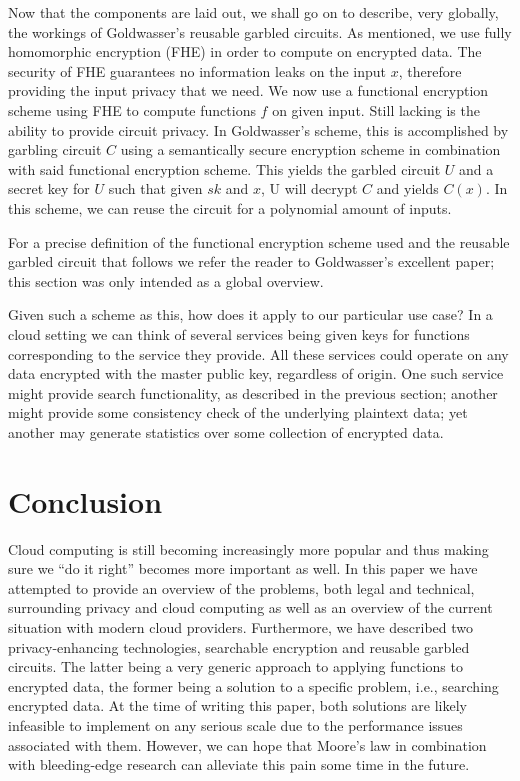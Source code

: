 \documentclass[12pt]{article}
\begin{document}
Now that the components are laid out, we shall go on to describe, very globally, the workings of Goldwasser's reusable garbled circuits.
As mentioned, we use fully homomorphic encryption (FHE) in order to compute on encrypted data.
The security of FHE guarantees no information leaks on the input $x$, therefore providing the input privacy that we need.
We now use a functional encryption scheme using FHE to compute functions $f$ on given input.
Still lacking is the ability to provide circuit privacy.
In Goldwasser's scheme, this is accomplished by garbling circuit $C$ using a semantically secure encryption scheme in combination with said functional encryption scheme.
This yields the garbled circuit $U$ and a secret key for $U$ such that given $sk$ and $x$, U will decrypt $C$ and yields $C(x)$.
In this scheme, we can reuse the circuit for a polynomial amount of inputs.

For a precise definition of the functional encryption scheme used and the reusable garbled circuit that follows we refer the reader to Goldwasser's excellent paper; this section was only intended as a global overview.

Given such a scheme as this, how does it apply to our particular use case?
In a cloud setting we can think of several services being given keys for functions corresponding to the service they provide.
All these services could operate on any data encrypted with the master public key, regardless of origin.
One such service might provide search functionality, as described in the previous section;
another might provide some consistency check of the underlying plaintext data;
yet another may generate statistics over some collection of encrypted data.

\section{Conclusion}

Cloud computing is still becoming increasingly more popular and thus making sure we ``do it right'' becomes more important as well.
In this paper we have attempted to provide an overview of the problems, both legal and technical, surrounding privacy and cloud computing as well as an overview of the current situation with modern cloud providers.
Furthermore, we have described two privacy-enhancing technologies, searchable encryption and reusable garbled circuits.
The latter being a very generic approach to applying functions to encrypted data, the former being a solution to a specific problem, i.e., searching encrypted data.
At the time of writing this paper, both solutions are likely infeasible to implement on any serious scale due to the performance issues associated with them.
However, we can hope that Moore's law in combination with bleeding-edge research can alleviate this pain some time in the future.
\end{document}

